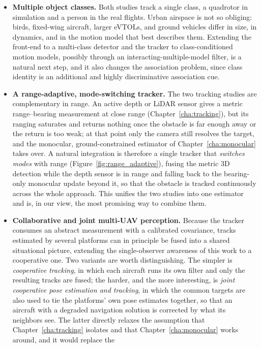 \begin{itemize}
  \item \textbf{Multiple object classes.} Both studies track a single class, a
  quadrotor in simulation and a person in the real flights. Urban airspace is not
  so obliging: birds, fixed-wing aircraft, larger eVTOLs, and ground vehicles
  differ in size, in dynamics, and in the motion model that best describes them.
  Extending the front-end to a multi-class detector and the tracker to
  class-conditioned motion models, possibly through an interacting-multiple-model
  filter, is a natural next step, and it also changes the association problem,
  since class identity is an additional and highly discriminative association cue.
  \item \textbf{A range-adaptive, mode-switching tracker.} The two tracking
  studies are complementary in range. An active depth or LiDAR sensor gives a
  metric range--bearing measurement at close range (Chapter~\ref{cha:tracking}),
  but its ranging saturates and returns nothing once the obstacle is far enough
  away or the return is too weak; at that point only the camera still resolves the
  target, and the monocular, ground-constrained estimator of
  Chapter~\ref{cha:monocular} takes over. A natural integration is therefore a
  single tracker that \emph{switches modes} with range (Figure~\ref{fig:range_adaptive}),
  fusing the metric 3D
  detection while the depth sensor is in range and falling back to the
  bearing-only monocular update beyond it, so that the obstacle is tracked
  continuously across the whole approach. This unifies the two studies into one
  estimator and is, in our view, the most promising way to combine them.
  \item \textbf{Collaborative and joint multi-UAV perception.} Because the tracker
  consumes an abstract measurement with a calibrated covariance, tracks estimated
  by several platforms can in principle be fused into a shared situational
  picture, extending the single-observer awareness of this work to a cooperative
  one. Two variants are worth distinguishing. The simpler is \emph{cooperative
  tracking}, in which each aircraft runs its own filter and only the resulting
  tracks are fused; the harder, and the more interesting, is \emph{joint
  cooperative pose estimation and tracking}, in which the common targets are also
  used to tie the platforms' own pose estimates together, so that an aircraft with
  a degraded navigation solution is corrected by what its neighbors see. The
  latter directly relaxes the assumption that Chapter~\ref{cha:tracking} isolates
  and that Chapter~\ref{cha:monocular} works around, and it would replace the

\end{itemize}
